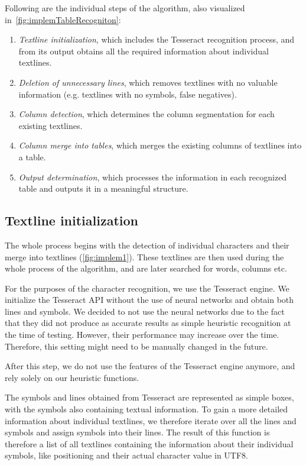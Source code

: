 Following are the individual steps of the algorithm, also visualized in~\cref{fig:implemTableRecogniton}:
\begin{enumerate}
\item \emph{Textline initialization}, which includes the Tesseract recognition process, and from its output obtains all the required information about individual textlines.
\item \emph{Deletion of unnecessary lines}, which removes textlines with no valuable information (e.g. textlines with no symbols, false negatives).
\item \emph{Column detection}, which determines the column segmentation for each existing textlines.
\item \emph{Column merge into tables}, which merges the existing columns of textlines into a table.
\item \emph{Output determination}, which processes the information in each recognized table and outputs it in a meaningful structure.
\end{enumerate}

\subsection{Textline initialization} \label{textlineInitialization}

The whole process begins with the detection of individual characters and their merge into textlines (\cref{fig:implem1}). These textlines are then used during the whole process of the algorithm, and are later searched for words, columns etc.

For the purposes of the character recognition, we use the Tesseract engine. We initialize the Tesseract API without the use of neural networks and obtain both lines and symbols. We decided to not use the neural networks due to the fact that they did not produce as accurate results as simple heuristic recognition at the time of testing. However, their performance may increase over the time. Therefore, this setting might need to be manually changed in the future.

After this step, we do not use the features of the Tesseract engine anymore, and rely solely on our heuristic functions.

The symbols and lines obtained from Tesseract are represented as simple boxes, with the symbols also containing textual information. To gain a more detailed information about individual textlines, we therefore iterate over all the lines and symbols and assign symbols into their lines. The result of this function is therefore a list of all textlines containing the information about their individual symbols, like positioning and their actual character value in UTF8.

